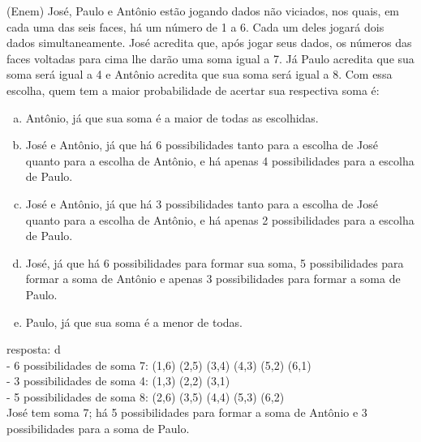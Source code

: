 \begin{ex}
  (Enem) José, Paulo e Antônio estão jogando dados não viciados, nos quais, em cada uma das seis faces, há um número de 1 a 6. Cada um deles jogará dois dados simultaneamente. José acredita que, após jogar seus dados, os números das faces voltadas para cima lhe darão uma soma igual a 7. Já Paulo acredita que sua soma será igual a 4 e Antônio acredita que sua soma será igual a 8. Com essa escolha, quem tem a maior probabilidade de acertar sua respectiva soma é:
    \begin{enumerate} [(a)]
        \item Antônio, já que sua soma é a maior de todas as escolhidas.
        \item José e Antônio, já que há 6 possibilidades tanto para a escolha de José quanto para a escolha de Antônio, e há apenas 4 possibilidades para a escolha de Paulo.
        \item José e Antônio, já que há 3 possibilidades tanto para a escolha de José quanto para a escolha de Antônio, e há apenas 2 possibilidades para a escolha de Paulo.
        \item José, já que há 6 possibilidades para formar sua soma, 5 possibilidades para formar a soma de Antônio e apenas 3 possibilidades para formar a soma de Paulo.
        \item Paulo, já que sua soma é a menor de todas.
    \end{enumerate}
      \begin{sol}
       resposta: d \\
       - 6 possibilidades de soma 7: (1,6) (2,5) (3,4) (4,3) (5,2) (6,1) \\
       - 3 possibilidades de soma 4: (1,3) (2,2) (3,1) \\
       - 5 possibilidades de soma 8:
       (2,6) (3,5) (4,4) (5,3) (6,2) \\
       José tem soma 7; há 5 possibilidades para formar a soma de Antônio e 3 possibilidades para a soma de Paulo.
       \end{sol}
 \end{ex}